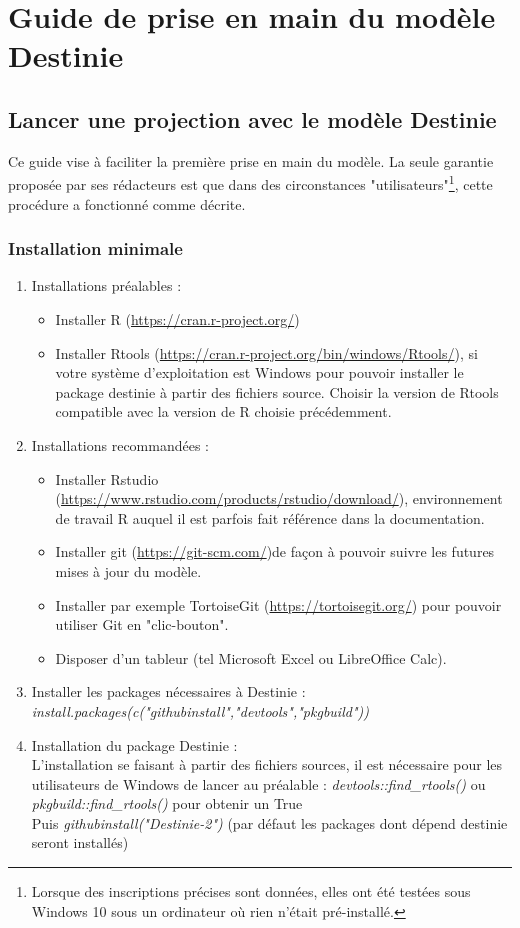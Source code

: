 \section{Guide de prise en main du modèle Destinie}
\subsection{Lancer une projection avec le modèle Destinie}
Ce guide vise à faciliter la première prise en main du modèle. La seule garantie proposée par ses rédacteurs est que dans des circonstances "utilisateurs"\footnote{Lorsque des inscriptions précises sont données, elles ont été testées sous Windows 10  sous un ordinateur où rien n'était pré-installé.}, cette procédure a fonctionné comme décrite.\\
\subsubsection{Installation minimale}
\begin{enumerate}
\item Installations préalables : \\
\begin{itemize}
\item Installer	R (\url{https://cran.r-project.org/}) 
\item Installer	Rtools (\url{https://cran.r-project.org/bin/windows/Rtools/}), si votre système d'exploitation est 				Windows pour pouvoir installer le package destinie à partir des fichiers source. Choisir la version de Rtools compatible 		avec la version de R choisie précédemment. 
\end{itemize}
\item Installations recommandées : \\
\begin{itemize}
\item Installer	Rstudio (\url{https://www.rstudio.com/products/rstudio/download/}), environnement de travail R auquel il est parfois fait référence dans la documentation.
\item Installer git (\url{https://git-scm.com/})de façon à pouvoir suivre les futures mises à jour du modèle.
\item Installer par exemple TortoiseGit (\url{https://tortoisegit.org/}) pour pouvoir utiliser Git en "clic-bouton".
\item Disposer d'un tableur (tel Microsoft Excel ou LibreOffice Calc).
\end{itemize}
\item Installer les packages nécessaires à Destinie :\\
\textit{install.packages(c("githubinstall","devtools","pkgbuild"))}
\item Installation du package Destinie :\\
L'installation se faisant à partir des fichiers sources, il est nécessaire pour les utilisateurs de Windows de lancer au préalable : \textit{devtools::find\_rtools()} ou \textit{pkgbuild::find\_rtools()} pour obtenir un True \\
Puis \textit{githubinstall("Destinie-2")} (par défaut les packages dont dépend destinie seront installés)
\end{enumerate}

